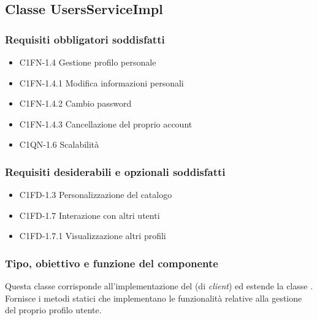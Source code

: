 \newpage
\subsection{Classe UsersServiceImpl}
\subsubsection*{Requisiti obbligatori soddisfatti}
\begin{itemize}
    \item C1FN-1.4 Gestione profilo personale
    \item C1FN-1.4.1 Modifica informazioni personali
    \item C1FN-1.4.2 Cambio password
    \item C1FN-1.4.3 Cancellazione del proprio account
    \item C1QN-1.6 Scalabilit\`a
\end{itemize}
\subsubsection*{Requisiti desiderabili e opzionali soddisfatti}
\begin{itemize}
    \item C1FD-1.3 Personalizzazione del catalogo
    \item C1FD-1.7 Interazione con altri utenti
    \item C1FD-1.7.1 Visualizzazione altri profili
\end{itemize}
\subsubsection*{Tipo, obiettivo e funzione del componente}
Questa classe corrisponde all'implementazione del  (di
\emph{client}) ed estende la classe . Fornisce i metodi
statici che implementano le funzionalit\`a relative alla gestione del proprio
profilo utente.
